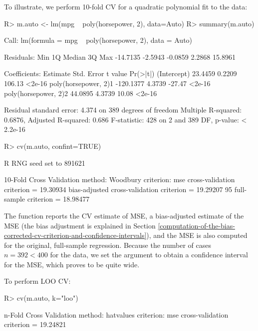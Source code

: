 \documentclass[
]{jss}
\begin{document}
To illustrate, we perform 10-fold CV for a quadratic polynomial fit to
the  data:

\begin{CodeChunk}
\begin{CodeInput}
R> m.auto <- lm(mpg ~ poly(horsepower, 2), data=Auto)
R> summary(m.auto)
\end{CodeInput}
\begin{CodeOutput}

Call:
lm(formula = mpg ~ poly(horsepower, 2), data = Auto)

Residuals:
     Min       1Q   Median       3Q      Max 
-14.7135  -2.5943  -0.0859   2.2868  15.8961 

Coefficients:
                      Estimate Std. Error t value Pr(>|t|)
(Intercept)            23.4459     0.2209  106.13   <2e-16
poly(horsepower, 2)1 -120.1377     4.3739  -27.47   <2e-16
poly(horsepower, 2)2   44.0895     4.3739   10.08   <2e-16

Residual standard error: 4.374 on 389 degrees of freedom
Multiple R-squared:  0.6876,    Adjusted R-squared:  0.686 
F-statistic:   428 on 2 and 389 DF,  p-value: < 2.2e-16
\end{CodeOutput}
\begin{CodeInput}
R> cv(m.auto, confint=TRUE)
\end{CodeInput}
\begin{CodeOutput}
R RNG seed set to 891621
\end{CodeOutput}
\begin{CodeOutput}
10-Fold Cross Validation
method: Woodbury
criterion: mse
cross-validation criterion = 19.30934
bias-adjusted cross-validation criterion = 19.29207
95%
full-sample criterion = 18.98477 
\end{CodeOutput}
\end{CodeChunk}

The function reports the CV estimate of MSE, a bias-adjusted estimate of
the MSE (the bias adjustment is explained in Section
\ref{computation-of-the-bias-corrected-cv-criterion-and-confidence-intervals}),
and the MSE is also computed for the original, full-sample regression.
Because the number of cases \(n = 392 < 400\) for the  data,
we set the argument  to obtain a confidence interval
for the MSE, which proves to be quite wide.

To perform LOO CV:

\begin{CodeChunk}
\begin{CodeInput}
R> cv(m.auto, k="loo")
\end{CodeInput}
\begin{CodeOutput}
n-Fold Cross Validation
method: hatvalues
criterion: mse
cross-validation criterion = 19.24821
\end{CodeOutput}
\end{CodeChunk}
\end{document}
